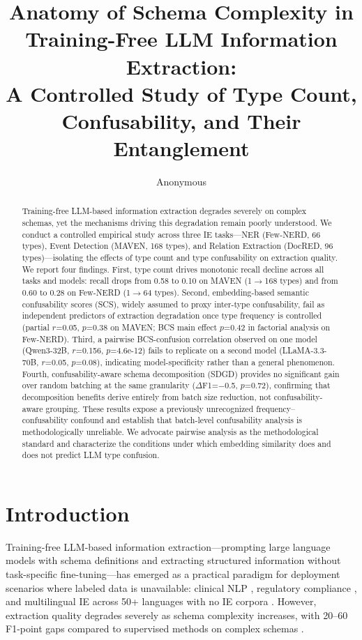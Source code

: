 \documentclass[11pt,a4paper]{article}
\title{Anatomy of Schema Complexity in Training-Free LLM Information Extraction:\\A Controlled Study of Type Count, Confusability, and Their Entanglement}
\author{Anonymous}
\begin{document}
\maketitle

\begin{abstract}
Training-free LLM-based information extraction degrades severely on complex schemas, yet the mechanisms driving this degradation remain poorly understood.
We conduct a controlled empirical study across three IE tasks---NER (Few-NERD, 66 types), Event Detection (MAVEN, 168 types), and Relation Extraction (DocRED, 96 types)---isolating the effects of type count and type confusability on extraction quality.
We report four findings.
First, type count drives monotonic recall decline across all tasks and models: recall drops from 0.58 to 0.10 on MAVEN (1$\to$168 types) and from 0.60 to 0.28 on Few-NERD (1$\to$64 types).
Second, embedding-based semantic confusability scores (SCS), widely assumed to proxy inter-type confusability, fail as independent predictors of extraction degradation once type frequency is controlled (partial $r$=0.05, $p$=0.38 on MAVEN; BCS main effect $p$=0.42 in factorial analysis on Few-NERD).
Third, a pairwise BCS-confusion correlation observed on one model (Qwen3-32B, $r$=0.156, $p$=4.6e-12) fails to replicate on a second model (LLaMA-3.3-70B, $r$=0.05, $p$=0.08), indicating model-specificity rather than a general phenomenon.
Fourth, confusability-aware schema decomposition (SDGD) provides no significant gain over random batching at the same granularity ($\Delta$F1=$-$0.5, $p$=0.72), confirming that decomposition benefits derive entirely from batch size reduction, not confusability-aware grouping.
These results expose a previously unrecognized frequency--confusability confound and establish that batch-level confusability analysis is methodologically unreliable.
We advocate pairwise analysis as the methodological standard and characterize the conditions under which embedding similarity does and does not predict LLM type confusion.
\end{abstract}

\section{Introduction}

Training-free LLM-based information extraction---prompting large language models with schema definitions and extracting structured information without task-specific fine-tuning---has emerged as a practical paradigm for deployment scenarios where labeled data is unavailable: clinical NLP \cite{}, regulatory compliance \cite{}, and multilingual IE across 50+ languages with no IE corpora \cite{}.
However, extraction quality degrades severely as schema complexity increases, with 20--60 F1-point gaps compared to supervised methods on complex schemas \cite{}.
\end{document}
